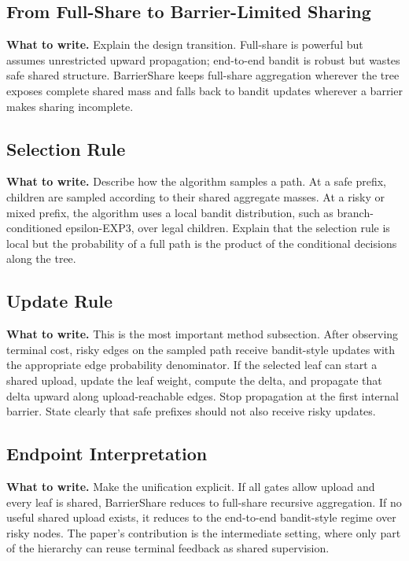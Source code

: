 \documentclass{article}
\newcommand{\towrite}[1]{\noindent\textbf{What to write.} #1}
\begin{document}
\subsection{From Full-Share to Barrier-Limited Sharing}

\towrite{Explain the design transition. Full-share is powerful but assumes unrestricted upward propagation; end-to-end bandit is robust but wastes safe shared structure. BarrierShare keeps full-share aggregation wherever the tree exposes complete shared mass and falls back to bandit updates wherever a barrier makes sharing incomplete.}

\subsection{Selection Rule}

\towrite{Describe how the algorithm samples a path. At a safe prefix, children are sampled according to their shared aggregate masses. At a risky or mixed prefix, the algorithm uses a local bandit distribution, such as branch-conditioned epsilon-EXP3, over legal children. Explain that the selection rule is local but the probability of a full path is the product of the conditional decisions along the tree.}

\subsection{Update Rule}

\towrite{This is the most important method subsection. After observing terminal cost, risky edges on the sampled path receive bandit-style updates with the appropriate edge probability denominator. If the selected leaf can start a shared upload, update the leaf weight, compute the delta, and propagate that delta upward along upload-reachable edges. Stop propagation at the first internal barrier. State clearly that safe prefixes should not also receive risky updates.}

\subsection{Endpoint Interpretation}

\towrite{Make the unification explicit. If all gates allow upload and every leaf is shared, BarrierShare reduces to full-share recursive aggregation. If no useful shared upload exists, it reduces to the end-to-end bandit-style regime over risky nodes. The paper's contribution is the intermediate setting, where only part of the hierarchy can reuse terminal feedback as shared supervision.}
\end{document}
